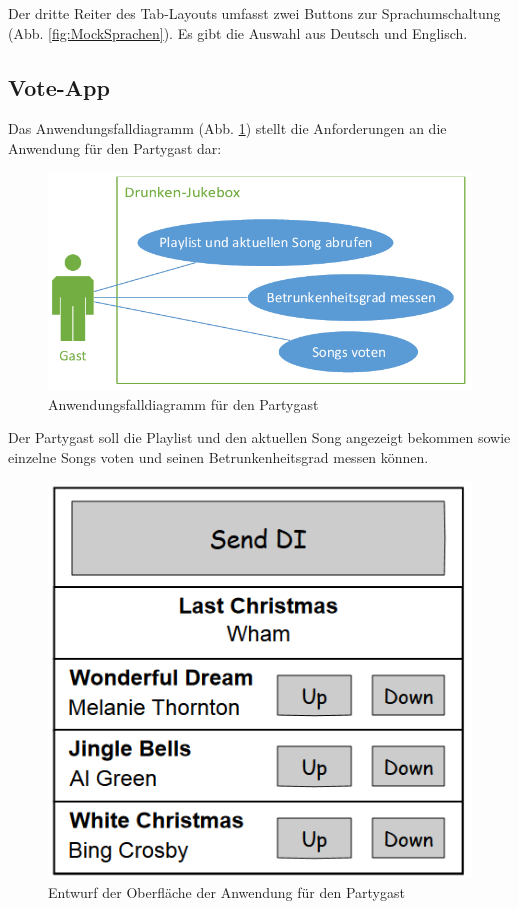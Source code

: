 Der dritte Reiter des Tab-Layouts umfasst zwei Buttons zur Sprachumschaltung (Abb. \ref{fig:MockSprachen}). Es gibt die Auswahl aus Deutsch und Englisch.

\subsection{Vote-App}
Das Anwendungsfalldiagramm (Abb. \ref{fig:PartyPeopleUseCase}) stellt die Anforderungen an die Anwendung für den Partygast dar:

\begin{figure}[H]
\centering
\includegraphics[width=0.8\linewidth]{Bilder/PartyPeopleUseCase}
\caption{Anwendungsfalldiagramm für den Partygast}
\label{fig:PartyPeopleUseCase}
\end{figure}

Der Partygast soll die Playlist und den aktuellen Song angezeigt bekommen sowie einzelne Songs voten und seinen Betrunkenheitsgrad messen können.

\begin{figure}[H]
\centering
\includegraphics[width=0.6\linewidth]{Bilder/MockPartyPeopleClient}
\caption{Entwurf der Oberfläche der Anwendung für den Partygast}
\label{fig:MockPartyPeopleClient}
\end{figure}

